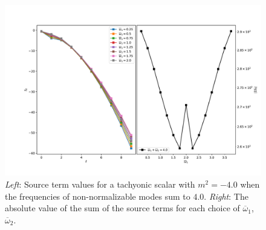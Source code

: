 \documentclass[letterpaper,11pt]{article}
\newcommand{\oone}{\overline{\omega}_1}
\newcommand{\otwo}{\overline{\omega}_2}
\begin{document}
\begin{figure}
\centering
\includegraphics[width=\textwidth]{./figures/NNAddToInteger_source_n2_m-4_0}
\caption{{\it Left}: Source term values for a tachyonic scalar with $m^2 = -4.0$ when the frequencies of non-normalizable modes sum to $4.0$. {\it Right}: The absolute value of the sum of the source terms for each choice of $\oone$, $\otwo$.}
\label{fig:atoi_all_m-4_0}
\end{figure}
\end{document}
